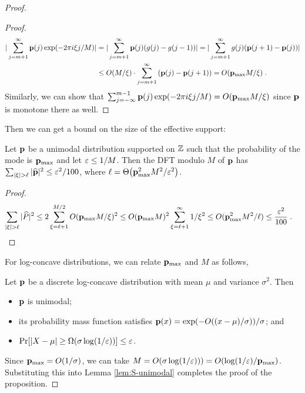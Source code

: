 \begin{proof}
\begin{proof}
\begin{align*}
|\sum_{j=m+1}^\infty \mathbf{p}(j) \exp(-2\pi i \xi j/M)| 
&= |\sum_{j=m+1}^\infty \mathbf{p}(j) (g(j)-g(j-1))| 
= |\sum_{j=m+1}^\infty g(j) (\mathbf{p}(j+1)-\mathbf{p}(j)) | \\
& \leq O(M/\xi) \cdot \sum_{j=m+1}^\infty \left( \mathbf{p}(j)- \mathbf{p}(j+1) \right)
 = O(\mathbf{p}_{\max}M/\xi) \;.
\end{align*}
Similarly, we can show that $\sum_{j=-\infty}^{m-1} \mathbf{p}(j) \exp(-2\pi i \xi j/M)= O(\mathbf{p}_{\max}M/\xi)$ since $\mathbf{p}$ is monotone there as well.
\end{proof}
\noindent Then we can get a bound on the size of the effective support:
\begin{lemma} \label{lem:S-unimodal}
Let $\mathbf{p}$ be a unimodal distribution supported on $\mathbb{Z}$ such that the probability of the mode is $\mathbf{p}_{\max}$ and let $\varepsilon \leq 1/M$. 
Then the DFT modulo $M$ of $\mathbf{p}$ has $\sum_{|\xi| > \ell} |\widehat{\mathbf{p}}|^2 \leq \varepsilon^2/100$, where $\ell= \bigTheta{\p_{\max}^2M^2/\eps^2}$.
\end{lemma}
\begin{proof}
\begin{align*}
\sum_{|\xi| > \ell} |\widehat{P}|^2 & \leq 2\sum_{\xi=\ell+1}^{M/2} O(\mathbf{p}_{\max}M/\xi)^2 
 \leq O(\mathbf{p}_{\max}M)^2 \sum_{\xi=\ell+1}^\infty 1/\xi^2 
 \leq O(\mathbf{p}_{\max}^2M^2/\ell) \leq \frac{\varepsilon^2}{100} \;. 
\end{align*}
\end{proof}
For log-concave distributions, we can relate $\mathbf{p}_{\max}$ and $M$ as follows,
\begin{fact} \label{fact:log-concave-standard} 
Let $\mathbf{p}$ be a discrete log-concave distribution with mean $\mu$ and variance $\sigma^2$. 
Then 
\begin{itemize}
\item $\mathbf{p}$ is unimodal;
\item its probability mass function satisfies $\mathbf{p}(x)=\exp(-O((x-\mu)/\sigma))/\sigma$; and
\item $\Pr[|X-\mu| \geq \Omega(\sigma \log(1/\varepsilon))] \leq \varepsilon$.
\end{itemize}
\end{fact}
Since $\mathbf{p}_{\max}=O(1/\sigma)$, we can take $M=O(\sigma \log(1/\varepsilon)))=O(\log(1/\varepsilon)/\mathbf{p}_{\max})$. 
Substituting this into Lemma \ref{lem:S-unimodal} completes the proof of the proposition.
\end{proof}
 
